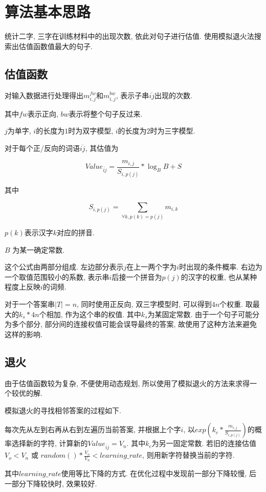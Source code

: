 \section{算法基本思路}
统计二字, 三字在训练材料中的出现次数, 依此对句子进行估值. 使用模拟退火法搜索出估值函数值最大的句子.

\subsection{估值函数}
对输入数据进行处理得出$m^{fw}_{i,j}$和$m^{bw}_{i,j}$, 表示子串$\overline{ij}$出现的次数. 

其中$fw$表示正向, $bw$表示将整个句子反过来. 

$j$为单字, $i$的长度为$1$时为双字模型, $i$的长度为$2$时为三字模型.

对于每个正/反向的词语$\overline{ij}$, 其估值为

$$ Value_{\overline{ij}} = \frac{m_{i,j}}{S_{i,p(j)}} * \log_{B}{B+S} $$

其中

$$ S_{i,p(j)} = \sum_{\forall k, p(k) = p(j)}m_{i,k} $$

$p(k)$表示汉字$k$对应的拼音.

$B$ 为某一确定常数.

这个公式由两部分组成. 左边部分表示$j$在上一两个字为$i$时出现的条件概率. 右边为一个取值范围较小的系数, 表示串$i$后接一个拼音为$p(j)$的汉字的权重, 也从某种程度上反映$i$的词频.

对于一个答案串$|T|=n$, 同时使用正反向, 双三字模型时, 可以得到$4n$个权重. 取最大的$k_s*4n$个相加, 作为这个串的权值. 其中$k_s$为某固定常数. 由于一个句子可能分为多个部分, 部分间的连接权值可能会误导最终的答案, 故使用了这种方法来避免这样的影响. 

\subsection{退火}
由于估值函数较为复杂, 不便使用动态规划, 所以使用了模拟退火的方法来求得一个较优的解. 

模拟退火的寻找相邻答案的过程如下.

每次先从左到右再从右到左遍历当前答案, 并根据上个字$i$, 以$exp(k_c * \frac{m_{i,j}}{S_{i,p(j)}})$的概率选择新的字符, 计算新的$Value_{\overline{ij}} = V_n$. 其中$k_c$为另一固定常数. 若旧的连接估值$V_o < V_n$ 或 $ random() * \frac{V_o}{V_n} < learning\_rate$, 则用新字符替换当前的字符.

其中$learning\_rate$使用等比下降的方式. 在优化过程中发现前一部分下降较慢, 后一部分下降较快时, 效果较好.

